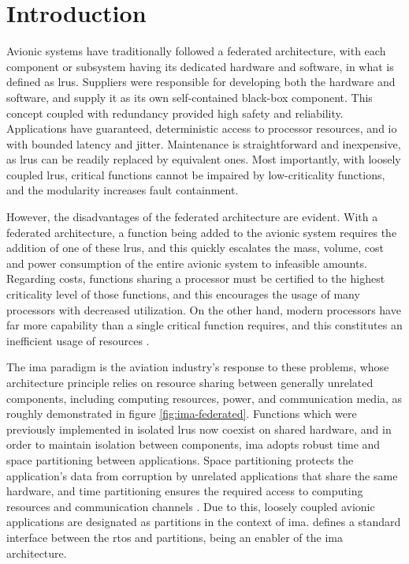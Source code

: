 \documentclass[main.tex]{subfiles}
\begin{document}
\section{Introduction}

Avionic systems have traditionally followed a federated architecture, with each component or subsystem having its dedicated hardware and software, in what is defined as \glspl{lru}.
Suppliers were responsible for developing both the hardware and software, and supply it as its own self-contained black-box component.
This  concept coupled with redundancy provided high safety and reliability.
Applications have guaranteed, deterministic access to processor resources, and \gls{io} with bounded latency and jitter.
Maintenance is straightforward and inexpensive, as \glspl{lru} can be readily replaced by equivalent ones.
Most importantly, with loosely coupled \glspl{lru}, critical functions cannot be impaired by low-criticality functions, and the modularity increases fault containment.

However, the disadvantages of the federated architecture are evident.
With a federated architecture, a function being added to the avionic system requires the addition of one of these \glspl{lru}, and this quickly escalates the mass, volume, cost and power consumption of the entire avionic system to infeasible amounts.
Regarding costs, functions sharing a processor must be certified to the highest criticality level of those functions, and this encourages the usage of many processors with decreased utilization.
On the other hand, modern processors have far more capability than a single critical function requires, and this constitutes an inefficient usage of resources \cite{mairaj2015preferred}.

The \gls{ima} paradigm is the aviation industry's response to these problems, whose architecture principle relies on resource sharing between generally unrelated components, including computing resources, power, and communication media, as roughly demonstrated in figure \ref{fig:ima-federated}.
Functions which were previously implemented in isolated \glspl{lru} now coexist on shared hardware, and in order to maintain isolation between components, \gls{ima} adopts robust time and space partitioning between applications.
Space partitioning protects the application's data from corruption by unrelated applications that share the same hardware, and time partitioning ensures the required access to computing resources and communication channels \cite{ananda2013arinc}.
Due to this, loosely coupled avionic applications are designated as partitions in the context of \gls{ima}.
 defines a standard interface between the \gls{rtos} and partitions, being an enabler of the \gls{ima} architecture.
\end{document}

